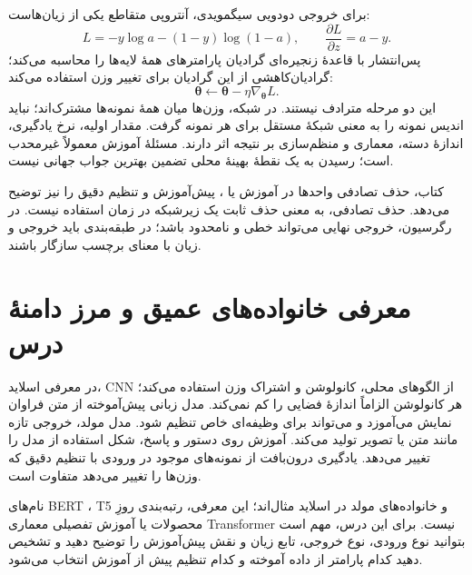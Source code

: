 برای خروجی دودویی سیگمویدی، آنتروپی متقاطع یکی از زیان‌هاست:
\[L=-y\log a-(1-y)\log(1-a),\qquad \frac{\partial L}{\partial z}=a-y.\]
پس‌انتشار با قاعدهٔ زنجیره‌ای گرادیان پارامترهای همهٔ لایه‌ها را محاسبه می‌کند؛ گرادیان‌کاهشی از این گرادیان برای تغییر وزن استفاده می‌کند:
\[\boldsymbol\theta\leftarrow\boldsymbol\theta-\eta\nabla_{\boldsymbol\theta}L.\]
این دو مرحله مترادف نیستند. در شبکه، وزن‌ها میان همهٔ نمونه‌ها مشترک‌اند؛ نباید اندیس نمونه را به معنی شبکهٔ مستقل برای هر نمونه گرفت. مقدار اولیه، نرخ یادگیری، اندازهٔ دسته، معماری و منظم‌سازی بر نتیجه اثر دارند. مسئلهٔ آموزش معمولاً غیرمحدب است؛ رسیدن به یک نقطهٔ بهینهٔ محلی تضمین بهترین جواب جهانی نیست.

کتاب، حذف تصادفی واحدها در آموزش یا ، پیش‌آموزش و تنظیم دقیق را نیز توضیح می‌دهد. حذف تصادفی، به معنی حذف ثابت یک زیرشبکه در زمان استفاده نیست. در رگرسیون، خروجی نهایی می‌تواند خطی و نامحدود باشد؛ در طبقه‌بندی باید خروجی و زیان با معنای برچسب سازگار باشند.

\section{معرفی خانواده‌های عمیق و مرز دامنهٔ درس}
در معرفی اسلاید، CNN از الگوهای محلی، کانولوشن و اشتراک وزن استفاده می‌کند؛ هر کانولوشن الزاماً اندازهٔ فضایی را کم نمی‌کند. مدل زبانی پیش‌آموخته از متن فراوان نمایش می‌آموزد و می‌تواند برای وظیفه‌ای خاص تنظیم شود. مدل مولد، خروجی تازه مانند متن یا تصویر تولید می‌کند. آموزش روی دستور و پاسخ، شکل استفاده از مدل را تغییر می‌دهد. یادگیری درون‌بافت از نمونه‌های موجود در ورودی با تنظیم دقیق که وزن‌ها را تغییر می‌دهد متفاوت است.

نام‌های BERT ، T5 و خانواده‌های مولد در اسلاید مثال‌اند؛ این معرفی، رتبه‌بندی روزِ محصولات یا آموزش تفصیلی معماری Transformer نیست. برای این درس، مهم است بتوانید نوع ورودی، نوع خروجی، تابع زیان و نقش پیش‌آموزش را توضیح دهید و تشخیص دهید کدام پارامتر از داده آموخته و کدام تنظیم پیش از آموزش انتخاب می‌شود.
